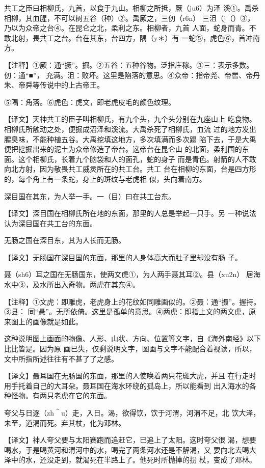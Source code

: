 \documentclass[a4paper,12pt,UTF8,twoside]{ctexbook}
\begin{document}
共工之臣曰相柳氏，九首，以食于九山。相柳之所抵，厥（ju6）为泽 溪①。禹杀相柳，其血腥，不可以树五谷（种）②。禹厥之，三仞（r6n） 三沮（j（）③，乃以为众帝之台④。在昆仑之北，柔利之东。相柳者，九首 人面，蛇身而青。不敢北射，畏共工之台。台在其东，台四方，隅（y＊）有 一蛇⑤，虎色⑥，首冲南方。

【注释】①厥：通“撅”。掘。②五谷：五种谷物。泛指庄稼。③三：表示多数。仞：通“■”， 充满。沮：败坏。这里是陷落的意思。④众帝：指帝尧、帝喾、帝丹朱、帝舜等传说中的上古帝王。

⑤隅：角落。⑥虎色：虎文，即老虎皮毛的颜色纹理。

【译文】天神共工的臣子叫相柳氏，有九个头，九个头分别在九座山上 吃食物。相柳氏所触动之处，便掘成沼泽和溪流。大禹杀死了相柳氏，血流 过的地方发出腥臭味，不能种植五谷。大禹挖填这地方，多次填满而多次蹋 陷下去，于是大禹便把挖掘出来的泥土为众帝修造了帝台。这帝台在昆仑山 的北面，柔利国的东面。这个相柳氏，长着九个脑袋和人的面孔，蛇的身子 而是青色。射箭的人不敢向北方射，因为敬畏共工威灵所在的共工台。共工 台在相柳的东面，台是四方形的，每个角上有一条蛇，身上的斑纹与老虎相 似，头向着南方。

深目国在其东，为人举一手。一（目）曰在共工台东。

【译文】深目国在相柳氏所在地的东面，那里的人总是举起一只手。另 一种说法认为深目国在共工台的东面。

无肠之国在深目东，其为人长而无肠。

【译文】无肠国在深目国的东面，那里的人身体高大而肚子里却没有肠 子。

聂（sh6）耳之国在无肠国东，使两文虎①，为人两手聂其耳②。县（xu2n） 居海水中③，及水所出入奇物。两虎在其东④。

【注释】①文虎：即雕虎，老虎身上的花纹如同雕画似的。②聂：通“摄”。握持。③县： 同“悬”。无所依倚。这里是孤单的意思。④两虎：即指上文的两文虎，原来图上的画像就是如此。

这种说明图上画面的物像、人形、山状、方向、位置等文字，自《海外南经》以下比比皆是。因为原 画已失，仅剩说明文字，图画与文字不能配合着视读，所以，文中所指所述往往有不甚了了之感。

【译文】聂耳国在无肠国的东面，那里的人使唤着两只花斑大虎，并且 在行走时用手托着自己的大耳朵。聂耳国在海水环绕的孤岛上，所以能看到 出入海水的各种怪物。有两只老虎在它的东面。

夸父与日逐（zh＾u）走，入日。渴，欲得饮，饮于河渭，河渭不足，北 饮大泽，未至，道渴而死。弃其杖，化为邓林。

【译文】神人夸父要与太阳赛跑而追赶它，已追上了太阳。这时夸父很 渴，想要喝水，于是喝黄河和渭河中的水，喝完了两条河水还是不解渴，又 要向北去喝大泽中的水，还没走到，就渴死在半路上了。他死时所抛掉的拐 杖，变成了邓林。
\end{document}
